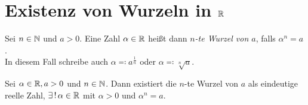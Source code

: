 \documentclass[../ana1.tex]{subfiles}
\begin{document}
\setcounter{section}{5}

\section{Existenz von Wurzeln in \(\mathbb{R} \)}

\begin{notation}
	Sei \( n \in\mathbb{N} \) und \(a > 0 \). Eine Zahl \(\alpha \in \mathbb{R} \) 
	heißt dann \textit{\(n\)-te Wurzel von \(a \)}, 
	falls \(\alpha^n = a \).\\
	In diesem Fall schreibe auch 
	\( \alpha \eqqcolon a^{\frac{1}{n}}\) 
	oder \(\alpha \eqqcolon \sqrt[n]{a} \).
\end{notation}

\begin{satz}\label{satz:ex_wurzel}
	Sei \(\alpha \in\mathbb{R}, a>0\) und \(n \in \mathbb{N} \). Dann existiert die \(n\)-te Wurzel von \(a\) als eindeutige reelle Zahl,
	\dphp{} \(\existse \, \alpha \in \R \) mit \(\alpha > 0 \) und \(\alpha^n = a \).
\end{satz}
\end{document}
